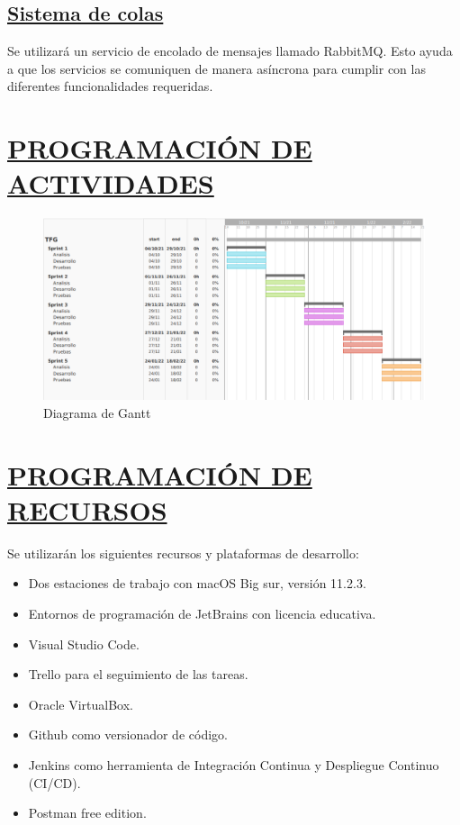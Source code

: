 \subsection*{\underline{Sistema de colas}}
Se utilizará un servicio de encolado de mensajes llamado RabbitMQ. Esto ayuda a que los servicios se comuniquen de manera asíncrona para cumplir con las diferentes funcionalidades requeridas.

\section*{\underline{PROGRAMACIÓN DE ACTIVIDADES}}

\begin{figure}[H]
	\centering
	\includegraphics[width=\textwidth]{imagenes/gantt.png} 
	\caption{Diagrama de Gantt}
\end{figure}


\section*{\underline{PROGRAMACIÓN DE RECURSOS}}
Se utilizarán los siguientes recursos y plataformas de desarrollo:
\begin{itemize}
	\item Dos estaciones de trabajo con macOS Big sur, versión 11.2.3.
	\item Entornos de programación de JetBrains con licencia educativa.
	\item Visual Studio Code.
	\item Trello para el seguimiento de las tareas.
	\item Oracle VirtualBox.
	\item Github como versionador de código.
	\item Jenkins como herramienta de Integración Continua y Despliegue Continuo (CI/CD).
	\item Postman free edition.
\end{itemize}

